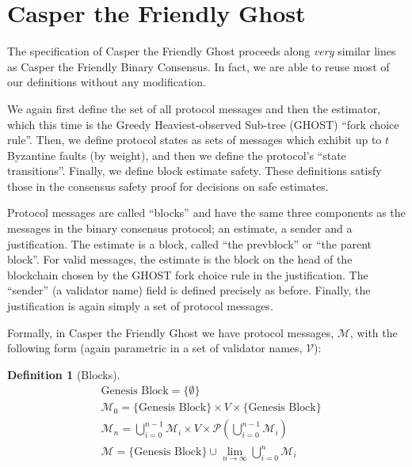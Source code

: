 \documentclass{article}
\theoremstyle{definition}
\newtheorem{defn}{Definition}[section]
\begin{document}
\section{Casper the Friendly Ghost}

The specification of Casper the Friendly Ghost proceeds along \emph{very} similar lines as Casper the Friendly Binary Consensus. In fact, we are able to reuse most of our definitions without any modification.

We again first define the set of all protocol messages and then the estimator, which this time is the Greedy Heaviest-observed Sub-tree (GHOST) ``fork choice rule''. Then, we define protocol states as sets of messages which exhibit up to $t$ Byzantine faults (by weight), and then we define the protocol's ``state transitions''. Finally, we define block estimate safety. These definitions satisfy those in the consensus safety proof for decisions on safe estimates.

Protocol messages are called ``blocks'' and have the same three components as the messages in the binary consensus protocol; an estimate, a sender and a justification. The estimate is a block, called ``the prevblock'' or ``the parent block''. For valid messages, the estimate is the block on the head of the blockchain chosen by the GHOST fork choice rule in the justification. The ``sender'' (a validator name) field is defined precisely as before. Finally, the justification is again simply a set of protocol messages.

Formally, in Casper the Friendly Ghost we have protocol messages, $\mathcal{M}$, with the following form (again parametric in a set of validator names, $\mathcal{V}$):


\begin{defn}[Blocks]
\begin{equation*}
\begin{split}
  &\text{Genesis Block} = \{\emptyset\}\\
    &\mathcal{M}_0 = \{\text{Genesis Block}\} \times V \times \{\text{Genesis Block}\}\\
    &\mathcal{M}_n = \bigcup_{i=0}^{n-1} \mathcal{M}_i \times V \times \mathcal{P}(\bigcup_{i=0}^{n-1} \mathcal{M}_i)\\
    &\mathcal{M} = \{\text{Genesis Block}\} \cup \lim_{n \to \infty} \bigcup_{i=0}^{n} \mathcal{M}_i
\end{split}
\end{equation*}
\end{defn}
\end{document}
